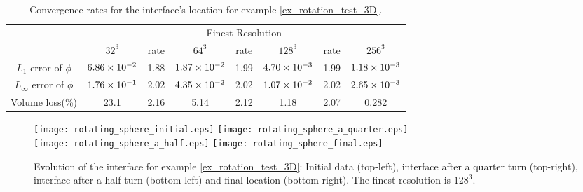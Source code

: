 \documentclass[english]{article}
\begin{document}
\begin{table}
\begin{center}
\begin{tabular}{|c|c|c|c|c|c|c|c|}\hline
\multirow{2}{*}{} & \multicolumn{7}{|c|}{Finest Resolution}\\\cline{2-8}
                  & $32^3$ & rate & $64^3$ & rate & $128^3$ & rate & $256^3$ \\\hline
$L_1$      error of $\phi$ & $6.86\times 10^{-2}$ & 1.88 & $1.87\times 10^{-2}$ & 1.99 & $4.70\times 10^{-3}$ & 1.99 &
$1.18\times 10^{-3}$ \\\hline $L_\infty$ error of $\phi$ & $1.76\times 10^{-1}$ & 2.02 & $4.35\times 10^{-2}$ & 2.02 &
$1.07\times 10^{-2}$ & 2.02 & $2.65\times 10^{-3}$ \\\hline Volume loss(\%)            & 23.1 & 2.16 & 5.14 &
2.12 & 1.18 & 2.07 & 0.282 \\\hline
\end{tabular}
\end{center}
\caption{Convergence rates for the interface's location for example \ref{ex_rotation_test_3D}.}
\label{tab_ex_rotation_test_3D}
\end{table}

\begin{figure}
\begin{center}
\texttt{[image: rotating\_sphere\_initial.eps]}
\texttt{[image: rotating\_sphere\_a\_quarter.eps]}\\
\texttt{[image: rotating\_sphere\_a\_half.eps]}
\texttt{[image: rotating\_sphere\_final.eps]}
\end{center}
\caption{Evolution of the interface for example \ref{ex_rotation_test_3D}: Initial data (top-left),
interface after a quarter turn (top-right), interface after a half turn (bottom-left) and final
location (bottom-right). The finest resolution is $128^3$.} \label{fig_rotating_sphere}
\end{figure}

\end{document}
